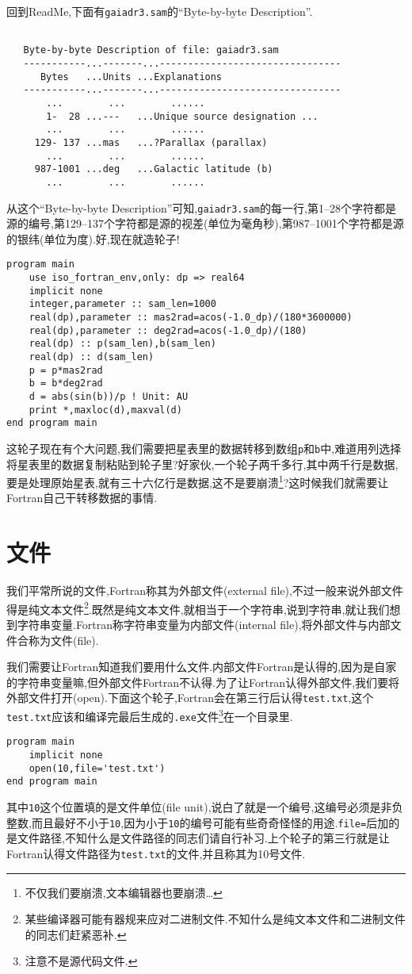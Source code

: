 回到ReadMe,下面有\texttt{gaiadr3.sam}的``Byte-by-byte Description''.
\begin{lstlisting}

   Byte-by-byte Description of file: gaiadr3.sam
   -----------...-------...--------------------------------
      Bytes   ...Units ...Explanations
   -----------...-------...--------------------------------
       ...        ...        ......
       1-  28 ...---   ...Unique source designation ...
       ...        ...        ......
     129- 137 ...mas   ...?Parallax (parallax)
       ...        ...        ......
     987-1001 ...deg   ...Galactic latitude (b)
       ...        ...        ......
\end{lstlisting}
从这个``Byte-by-byte Description''可知,\texttt{gaiadr3.sam}的每一行,第1--28个字符都是源的编号,第129--137个字符都是源的视差(单位为毫角秒),第987--1001个字符都是源的银纬(单位为度).好,现在就造轮子!\label{gaiadr3.sam}
\begin{lstlisting}
program main
    use iso_fortran_env,only: dp => real64
    implicit none
    integer,parameter :: sam_len=1000
    real(dp),parameter :: mas2rad=acos(-1.0_dp)/(180*3600000)
    real(dp),parameter :: deg2rad=acos(-1.0_dp)/(180)
    real(dp) :: p(sam_len),b(sam_len)
    real(dp) :: d(sam_len)
    p = p*mas2rad
    b = b*deg2rad
    d = abs(sin(b))/p ! Unit: AU
    print *,maxloc(d),maxval(d)
end program main
\end{lstlisting}
这轮子现在有个大问题,我们需要把星表里的数据转移到数组\texttt{p}和\texttt{b}中,难道用列选择将星表里的数据复制粘贴到轮子里?好家伙,一个轮子两千多行,其中两千行是数据,要是处理原始星表,就有三十六亿行是数据,这不是要崩溃\footnote{不仅我们要崩溃,文本编辑器也要崩溃\dots}?这时候我们就需要让Fortran自己干转移数据的事情.

\section{文件}

我们平常所说的文件,Fortran称其为外部文件(external file),不过一般来说外部文件得是纯文本文件\footnote{某些编译器可能有器规来应对二进制文件.不知什么是纯文本文件和二进制文件的同志们赶紧恶补.}.既然是纯文本文件,就相当于一个字符串,说到字符串,就让我们想到字符串变量.Fortran称字符串变量为内部文件(internal file),将外部文件与内部文件合称为文件(file).

我们需要让Fortran知道我们要用什么文件.内部文件Fortran是认得的,因为是自家的字符串变量嘛,但外部文件Fortran不认得.为了让Fortran认得外部文件,我们要将外部文件打开(open).下面这个轮子,Fortran会在第三行后认得\texttt{test.txt},这个\texttt{test.txt}应该和编译完最后生成的\texttt{.exe}文件\footnote{注意不是源代码文件.}在一个目录里.
\begin{lstlisting}
program main
    implicit none
    open(10,file='test.txt')
end program main
\end{lstlisting}
其中\texttt{10}这个位置填的是文件单位(file unit),说白了就是一个编号,这编号必须是非负整数,而且最好不小于\texttt{10},因为小于\texttt{10}的编号可能有些奇奇怪怪的用途.\texttt{file=}后加的是文件路径,不知什么是文件路径的同志们请自行补习.上个轮子的第三行就是让Fortran认得文件路径为\texttt{test.txt}的文件,并且称其为10号文件.

